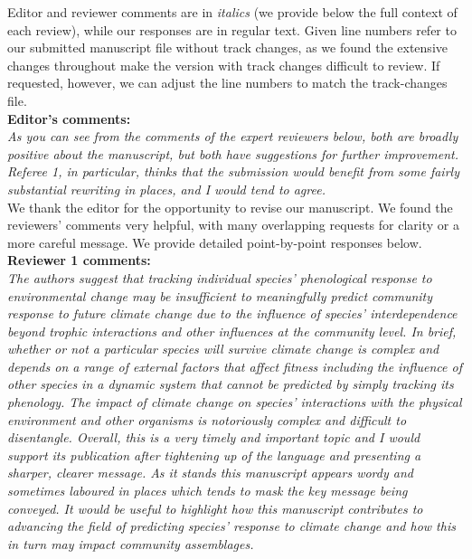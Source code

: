 \documentclass[11pt]{article}
\begin{document}
Editor and reviewer comments are in \emph{italics} (we provide below the full context of each review), while our responses are in regular text. Given line numbers refer to our submitted manuscript file without track changes, as we found the extensive changes throughout make the version with track changes difficult to review. If requested, however, we can adjust the line numbers to match the track-changes file.\\ 

{\bf Editor's comments:} \\

\emph{As you can see from the comments of the expert reviewers below, both are broadly positive
about the manuscript, but both have suggestions for further improvement. Referee 1, in
particular, thinks that the submission would benefit from some fairly substantial rewriting
in places, and I would tend to agree.}\\

We thank the editor for the opportunity to revise our manuscript. We found the reviewers' comments very helpful, with many overlapping requests for clarity or a more careful message. We provide detailed point-by-point responses below.\\

{\bf Reviewer 1 comments:} \\


\emph{The authors suggest that tracking individual species' phenological response to environmental
change may be insufficient to meaningfully predict community response to future climate
change due to the influence of species' interdependence beyond trophic interactions and other
influences at the community level. In brief, whether or not a particular species will survive
climate change is complex and depends on a range of external factors that affect fitness
including the influence of other species in a dynamic system that cannot be predicted by
simply tracking its phenology. The impact of climate change on species' interactions with the
physical environment and other organisms is notoriously complex and difficult to disentangle.
Overall, this is a very timely and important topic and I would support its publication after
tightening up of the language and presenting a sharper, clearer message. As it stands this
manuscript appears wordy and sometimes laboured in places which tends to mask the key message
being conveyed. It would be useful to highlight how this manuscript contributes to advancing
the field of predicting species' response to climate change and how this in turn may impact
community assemblages.}\\
\end{document}
